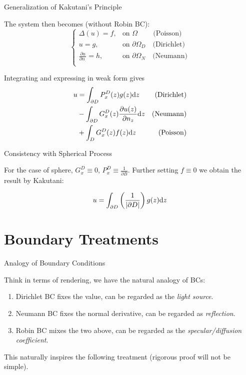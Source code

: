 \documentclass{beamer}
\begin{document}
\begin{frame}{Generalization of Kakutani's Principle}

	The system then becomes (without Robin BC):
	\[
		\begin{cases}
			\Delta(u) = f, & \text{on $\Omega$} \quad \quad\  \text{(Poisson)} \\
			u = g, & \text{on $\partial \Omega_D$} \quad \text{(Dirichlet)} \\
			\frac{\partial u}{\partial n_{\cdot}} = h, & \text{on $\partial \Omega_N$} \quad \text{(Neumann)} \\
		\end{cases}
	\]

	Integrating and expressing in weak form gives
	\begin{align*}
		u & = \int_{\partial D} P_x^D(z) g(z) \mathrm{d} z & \text{(Dirichlet)}\\
		  & - \int_{\partial D} G_x^D(z) \frac{\partial u(z)}{\partial n_{z}} \mathrm{d} z & \text{(Neumann)} \\
		  & + \int_{D} G_x^D(z) f(z) \mathrm{d} z & \text{(Poisson)}
	\end{align*}

\end{frame}

\begin{frame}{Consistency with Spherical Process}

	For the case of sphere, $G_x^D \equiv 0$, $P_x^D \equiv \frac{1}{\partial B}$. Further setting $f \equiv 0$ we obtain the result by Kakutani:

	\[
		u = \int_{\partial D} \left( \frac{1}{\left| \partial D \right|} \right) g(z) \mathrm{d} z
	\]

\end{frame}


\section{Boundary Treatments}

\begin{frame}{Analogy of Boundary Conditions}

	Think in terms of rendering, we have the natural analogy of BCs:
	\begin{enumerate}
		\item Dirichlet BC fixes the value, can be regarded as the \emph{light source}.
		\item Neumann BC fixes the normal derivative, can be regarded as \emph{reflection}.
		\item Robin BC mixes the two above, can be regarded as the \emph{specular/diffusion coefficient}.
	\end{enumerate}

	This naturally inspires the following treatment (rigorous proof will not be simple).

\end{frame}
\end{document}
